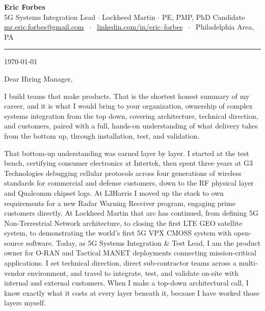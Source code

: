 \documentclass[10pt, letterpaper]{article}
\newcommand{\company}{your organization}
\begin{document}
\begin{center}
  {\Large\bfseries Eric Forbes}\\[2pt]
  {\footnotesize\color{accent}
    5G Systems Integration Lead $\cdot$ Lockheed Martin $\cdot$ PE, PMP, PhD Candidate
  }\\[2pt]
  {\footnotesize
    \href{mailto:mr.eric.forbes@gmail.com}{mr.eric.forbes@gmail.com}
    $\;\cdot\;$
    \href{https://www.linkedin.com/in/eric--forbes}{linkedin.com/in/eric--forbes}
    $\;\cdot\;$
    Philadelphia Area, PA
  }
\end{center}

\vspace{4pt}
{\color{accent}\rule{\linewidth}{0.4pt}}

\vspace{6pt}
\today

Dear Hiring Manager,

I build teams that make products. That is the shortest honest summary of my career, and it is
what I would bring to \company{}, ownership of complex systems integration from the top down,
covering architecture, technical direction, and customers, paired with a full, hands-on
understanding of what delivery takes from the bottom up, through installation, test, and
validation.

That bottom-up understanding was earned layer by layer. I started at the test bench, certifying
consumer electronics at Intertek, then spent three years at G3 Technologies debugging cellular
protocols across four generations of wireless standards for commercial and defense customers,
down to the RF physical layer and Qualcomm chipset logs. At L3Harris I moved up the stack to own
requirements for a new Radar Warning Receiver program, engaging prime customers directly. At
Lockheed Martin that arc has continued, from defining 5G Non-Terrestrial Network architecture, to
closing the first LTE GEO satellite system, to demonstrating the world's first 5G VPX CMOSS
system with open-source software. Today, as 5G Systems Integration \& Test Lead, I am the product
owner for O-RAN and Tactical MANET deployments connecting mission-critical applications. I set
technical direction, direct sub-contractor teams across a multi-vendor environment, and travel to
integrate, test, and validate on-site with internal and external customers. When I make a
top-down architectural call, I know exactly what it costs at every layer beneath it, because I
have worked those layers myself.
\end{document}
